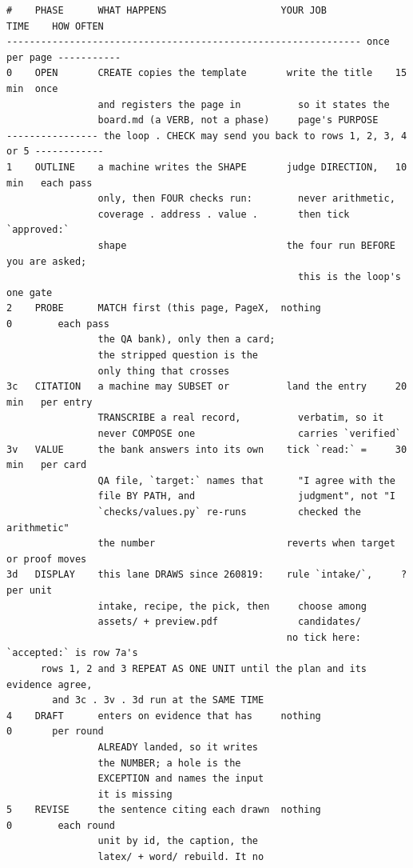 \begin{verbatim}
#    PHASE      WHAT HAPPENS                    YOUR JOB              TIME    HOW OFTEN
-------------------------------------------------------------- once per page -----------
0    OPEN       CREATE copies the template       write the title    15 min  once
                and registers the page in          so it states the
                board.md (a VERB, not a phase)     page's PURPOSE
---------------- the loop . CHECK may send you back to rows 1, 2, 3, 4 or 5 ------------
1    OUTLINE    a machine writes the SHAPE       judge DIRECTION,   10 min   each pass
                only, then FOUR checks run:        never arithmetic,
                coverage . address . value .       then tick `approved:`
                shape                            the four run BEFORE you are asked;
                                                   this is the loop's one gate
2    PROBE      MATCH first (this page, PageX,  nothing               0        each pass
                the QA bank), only then a card;
                the stripped question is the
                only thing that crosses
3c   CITATION   a machine may SUBSET or          land the entry     20 min   per entry
                TRANSCRIBE a real record,          verbatim, so it
                never COMPOSE one                  carries `verified`
3v   VALUE      the bank answers into its own    tick `read:` =     30 min   per card
                QA file, `target:` names that      "I agree with the
                file BY PATH, and                  judgment", not "I
                `checks/values.py` re-runs         checked the arithmetic"
                the number                       reverts when target or proof moves
3d   DISPLAY    this lane DRAWS since 260819:    rule `intake/`,     ?       per unit
                intake, recipe, the pick, then     choose among
                assets/ + preview.pdf              candidates/
                                                 no tick here: `accepted:` is row 7a's
      rows 1, 2 and 3 REPEAT AS ONE UNIT until the plan and its evidence agree,
        and 3c . 3v . 3d run at the SAME TIME
4    DRAFT      enters on evidence that has     nothing               0       per round
                ALREADY landed, so it writes
                the NUMBER; a hole is the
                EXCEPTION and names the input
                it is missing
5    REVISE     the sentence citing each drawn  nothing               0        each round
                unit by id, the caption, the
                latex/ + word/ rebuild. It no

\end{verbatim}
